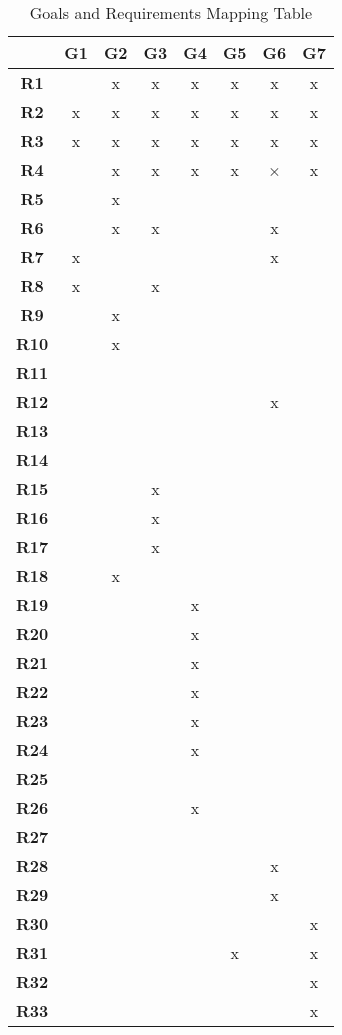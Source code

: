 \begin{table}[H] \centering \begin{tabular}{|c|c|c|c|c|c|c|c|} \hline & 
\textbf{G1} & 
\textbf{G2} & 
\textbf{G3} & 
\textbf{G4} & 
\textbf{G5} & 
\textbf{G6} & 
\textbf{G7} \\ \hline
\textbf{R1}  &  & x & x & x & x & x & x \\ \hline
\textbf{R2}  & x & x & x & x & x & x & x \\ \hline
\textbf{R3}  & x & x & x & x & x & x & x \\ \hline
\textbf{R4}  &  & x & x & x & x & × & x \\ \hline
\textbf{R5}  &  & x &  &  &  &  &  \\ \hline
\textbf{R6}  &  & x & x &  &  & x &  \\ \hline
\textbf{R7}  & x &  &  &  &  & x &  \\ \hline
\textbf{R8}  & x &  & x &  &  &  &  \\ \hline
\textbf{R9}  &  & x &  &  &  &  &  \\ \hline
\textbf{R10} &  & x &  &  &  &  &  \\ \hline
\textbf{R11} &  &  &  &  &  &  &  \\ \hline
\textbf{R12} &  &  &  &  &  & x &  \\ \hline
\textbf{R13} &  &  &  &  &  &  &  \\ \hline
\textbf{R14} &  &  &  &  &  &  &  \\ \hline
\textbf{R15} &  &  & x &  &  &  &  \\ \hline
\textbf{R16} &  &  & x &  &  &  &  \\ \hline
\textbf{R17} &  &  & x &  &  &  &  \\ \hline
\textbf{R18} &  & x &  &  &  &  &  \\ \hline
\textbf{R19} &  &  &  & x &  &  &  \\ \hline
\textbf{R20} &  &  &  & x &  &  &  \\ \hline
\textbf{R21} &  &  &  & x &  &  &  \\ \hline
\textbf{R22} &  &  &  & x &  &  &  \\ \hline
\textbf{R23} &  &  &  & x &  &  &  \\ \hline
\textbf{R24} &  &  &  & x &  &  &  \\ \hline
\textbf{R25} &  &  &  &  &  &  &  \\ \hline
\textbf{R26} &  &  &  & x &  &  &  \\ \hline
\textbf{R27} &  &  &  &  &  &  &  \\ \hline
\textbf{R28} &  &  &  &  &  & x &  \\ \hline
\textbf{R29} &  &  &  &  &  & x &  \\ \hline
\textbf{R30} &  &  &  &  &  &  & x \\ \hline
\textbf{R31} &  &  &  &  & x &  & x \\ \hline
\textbf{R32} &  &  &  &  &  &  & x \\ \hline
\textbf{R33} &  &  &  &  &  &  & x \\ \hline
\end{tabular} 
\caption{Goals and Requirements Mapping Table} \label{tab:reuirements_mapping} 
\end{table}

